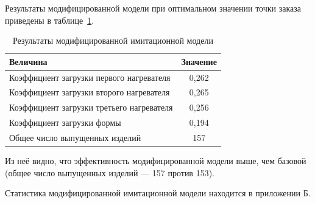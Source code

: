 Результаты модифицированной модели при оптимальном значении точки заказа
приведены в таблице~\ref{tbl:modified_result}.

\begin{table}[h!]
  \caption{Результаты модифицированной имитационной модели}
  \label{tbl:modified_result}
    \centering
    \begin{tabular}{| p{} | c |}
      \hline
      Величина & 
      Значение \\
      \hline

      Коэффициент загрузки первого нагревателя &
      0{,}262 \\
      \hline

      Коэффициент загрузки второго нагревателя &
      0{,}265 \\
      \hline

      Коэффициент загрузки третьего нагревателя &
      0{,}256 \\
      \hline

      Коэффициент загрузки формы &
      0{,}194 \\
      \hline

      Общее число выпущенных изделий &
      157 \\
      \hline

    \end{tabular}
\end{table}

Из неё видно, что эффективность модифицированной модели выше, чем базовой
(общее число выпущенных изделий --- 157 против 153).

Статистика модифицированной имитационной модели находится в приложении Б.